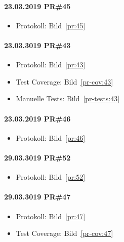 \documentclass[accentcolor=tud0b,12pt,paper=a4]{tudreport}
\begin{document}
\paragraph{23.03.2019 PR\#45}
\begin{itemize}
\item Protokoll: Bild~\ref{pr:45}
\end{itemize}

\paragraph{23.03.3019 PR\#43}
\begin{itemize}
\item Protokoll: Bild~\ref{pr:43}
\item Test Coverage: Bild~\ref{pr-cov:43}
\item Manuelle Tests: Bild~\ref{pr-tests:43}
\end{itemize}

\paragraph{23.03.2019 PR\#46}
\begin{itemize}
\item Protokoll: Bild~\ref{pr:46}
\end{itemize}

\paragraph{29.03.3019 PR\#52}
\begin{itemize}
\item Protokoll: Bild~\ref{pr:52}
\end{itemize}

\paragraph{29.03.3019 PR\#47}
\begin{itemize}
\item Protokoll: Bild~\ref{pr:47}
\item Test Coverage: Bild~\ref{pr-cov:47}
\end{itemize}
\end{document}
